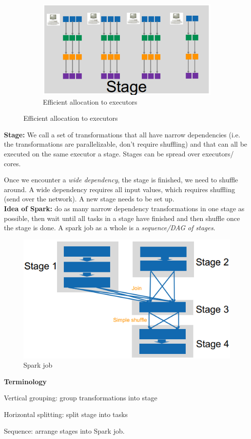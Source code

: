 \documentclass[11pt,oneside,a4paper]{article}
\begin{document}
\begin{figure}[hb!]
\begin{subfigure}[t]{.3\textwidth}
		\centering
		\includegraphics[width=0.8\linewidth]{figures/spark_transformation_sequence_eff}
		\caption{Efficient allocation to executors}
	\end{subfigure}
\end{figure}

\textbf{Stage:} We call a set of transformations that all have narrow dependencies (i.e. the transformations are parallelizable, don't require shuffling) and that can all be executed on the same executor a stage. Stages can be spread over executors/ cores.

Once we encounter a \textit{wide dependency}, the stage is finished, we need to shuffle around. A wide dependency requires all input values, which requires shuffling (send over the network). A new stage needs to be set up.\\

\textbf{Idea of Spark:} do as many narrow dependency transformations in one stage as possible, then wait until all tasks in a stage have finished and then shuffle once the stage is done. A spark job as a whole is a \textit{sequence/DAG of stages}.

\begin{figure}[hb!]
	\centering
	\includegraphics[width=0.3\linewidth]{figures/spark_job}
	\caption{Spark job}
	\label{fig:sparkjob}
\end{figure}

\textbf{Terminology}

\begin{compactitem}
\item Vertical grouping: group transformations into stage
\item Horizontal splitting: split stage into tasks
\item Sequence: arrange stages into Spark job.\\
\end{compactitem}
\end{document}
